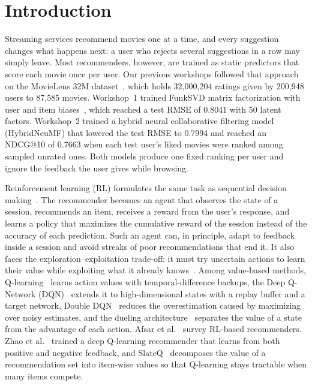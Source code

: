 \section{Introduction}
\label{sec:intro}

Streaming services recommend movies one at a time, and every suggestion changes what happens next: a user who rejects several suggestions in a row may simply leave. Most recommenders, however, are trained as static predictors that score each movie once per user. Our previous workshops followed that approach on the MovieLens 32M dataset~\cite{harper2015movielens}, which holds 32{,}000{,}204 ratings given by 200{,}948 users to 87{,}585 movies. Workshop~1 trained FunkSVD matrix factorization with user and item biases~\cite{koren2009matrix}, which reached a test RMSE of 0.8041 with 50 latent factors. Workshop~2 trained a hybrid neural collaborative filtering model (HybridNeuMF) that lowered the test RMSE to 0.7994 and reached an NDCG@10 of 0.7663 when each test user's liked movies were ranked among sampled unrated ones. Both models produce one fixed ranking per user and ignore the feedback the user gives while browsing.

Reinforcement learning (RL) formulates the same task as sequential decision making~\cite{sutton2018reinforcement,sierra2026rl}. The recommender becomes an agent that observes the state of a session, recommends an item, receives a reward from the user's response, and learns a policy that maximizes the cumulative reward of the session instead of the accuracy of each prediction. Such an agent can, in principle, adapt to feedback inside a session and avoid streaks of poor recommendations that end it. It also faces the exploration--exploitation trade-off: it must try uncertain actions to learn their value while exploiting what it already knows~\cite{sutton2018reinforcement}. Among value-based methods, Q-learning~\cite{watkins1992q} learns action values with temporal-difference backups, the Deep Q-Network (DQN)~\cite{mnih2015human} extends it to high-dimensional states with a replay buffer and a target network, Double DQN~\cite{van2016deep} reduces the overestimation caused by maximizing over noisy estimates, and the dueling architecture~\cite{wang2016dueling} separates the value of a state from the advantage of each action. Afsar et al.~\cite{afsar2022reinforcement} survey RL-based recommenders. Zhao et al.~\cite{zhao2018recommendations} trained a deep Q-learning recommender that learns from both positive and negative feedback, and SlateQ~\cite{ie2019slateq} decomposes the value of a recommendation set into item-wise values so that Q-learning stays tractable when many items compete.

